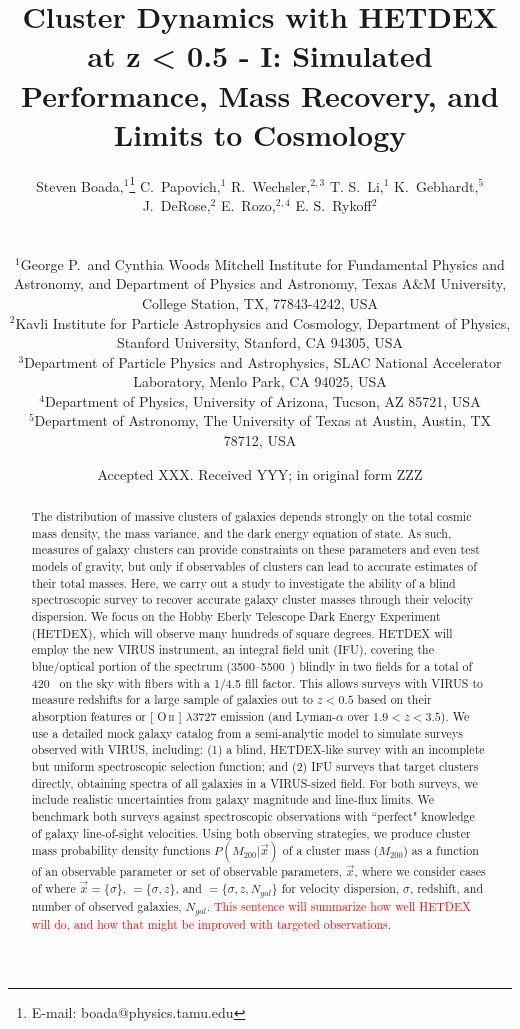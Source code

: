 \documentclass[fleqn,usenatbib]{mnras}
\title[Galaxy Clusters with HETDEX]{Cluster Dynamics with HETDEX at z < 0.5 - I: Simulated Performance, Mass Recovery, and Limits to Cosmology}
\author[S. Boada et al.]
{\parbox{\textwidth}{Steven Boada,$^{1}$\thanks{E-mail: boada@physics.tamu.edu}
C.~Papovich,$^{1}$
R.~Wechsler,$^{2,3}$
T. S.~Li,$^{1}$
K.~Gebhardt,$^{5}$
J.~DeRose,$^{2}$
E.~Rozo,$^{2,4}$
E. S.~Rykoff$^{2}$}\vspace{0.4cm}\
\\
\parbox{\textwidth}{$^{1}$George P.\ and Cynthia Woods Mitchell Institute for Fundamental Physics and Astronomy, and Department of Physics and Astronomy, Texas A\&M University, College Station, TX, 77843-4242, USA\\
$^{2}$Kavli Institute for Particle Astrophysics and Cosmology, Department of Physics, Stanford University, Stanford, CA 94305, USA\\
$^{3}$Department of Particle Physics and Astrophysics, SLAC National Accelerator Laboratory, Menlo Park, CA 94025, USA\\
$^{4}$Department of Physics, University of Arizona, Tucson, AZ 85721, USA\\
$^{5}$Department of Astronomy, The University of Texas at Austin, Austin, TX 78712, USA}}
\date{Accepted XXX. Received YYY; in original form ZZZ}
\makeatletter
\newcommand{\editorial}[1]{\textcolor{red}{#1}}
\DeclareRobustCommand{\ion}[2]{%
\relax\ifmmode
\ifx\testbx\f@series
{\mathbf{#1\,\mathsc{#2}}}\else
{\mathrm{#1\,\mathsc{#2}}}\fi
\else\textup{#1\,{\mdseries\textsc{#2}}}%
\fi}
\makeatother
\begin{document}
\label{firstpage}
\pagerange{\pageref{firstpage}--\pageref{lastpage}}
\maketitle

\begin{abstract}
\noindent
The distribution of massive clusters of galaxies depends strongly on the total cosmic mass density, the mass variance, and the dark energy equation of state. As such, measures of galaxy clusters can provide constraints on these parameters and even test models of gravity, but only if observables of clusters can lead to accurate estimates of their total masses. Here, we carry out a study to investigate the ability of a blind spectroscopic survey to recover accurate galaxy cluster masses through their velocity dispersion. We focus on the Hobby Eberly Telescope Dark Energy Experiment (HETDEX), which will observe many hundreds of square degrees. HETDEX will employ the new VIRUS instrument, an integral field unit (IFU), covering the blue/optical portion of the spectrum (3500--5500~\AAA) blindly in two fields for a total of 420 \degsq\ on the sky with fibers with a 1/4.5 fill factor. This allows surveys with VIRUS to measure redshifts for a large sample of galaxies out to $z < 0.5$ based on their absorption features or [\ion{O}{ii}] $\lambda$3727 emission (and Lyman-$\alpha$ over $1.9 < z < 3.5$). We use a detailed mock galaxy catalog from a semi-analytic model to simulate surveys observed with VIRUS, including: (1) a blind, HETDEX-like survey with an incomplete but uniform spectroscopic selection function; and (2) IFU surveys that target clusters directly, obtaining spectra of all galaxies in a VIRUS-sized field. For both surveys, we include realistic uncertainties from galaxy magnitude and line-flux limits. We benchmark both surveys against spectroscopic observations with ``perfect" knowledge of galaxy line-of-sight velocities. Using both observing strategies, we produce cluster mass probability density functions $P(M_{200}|\vec{x})$ of a cluster mass ($M_{200}$) as a function of an observable parameter or set of observable parameters, $\vec{x}$, where we consider cases of where $\vec{x} = \{\sigma\}$, $=\{\sigma, z\}$, and $=\{\sigma,z, N_{gal}\}$ for velocity dispersion, $\sigma$, redshift, and number of observed galaxies, $N_{gal}$. \editorial{This sentence will summarize how well HETDEX will do, and how that might be improved with targeted observations}.
\end{abstract}
\end{document}
